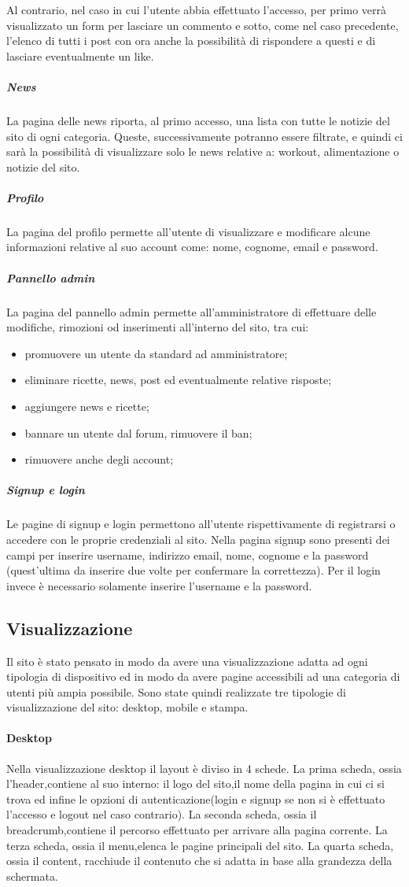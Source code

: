Al contrario, nel caso in cui l'utente abbia effettuato l'accesso, per primo verrà visualizzato un form per lasciare un commento e sotto, come nel caso precedente, l'elenco di tutti i post con ora anche la possibilità di rispondere a questi e di lasciare eventualmente un like.
\subparagraph{News}
La pagina delle news riporta, al primo accesso, una lista con tutte le notizie del sito di ogni categoria. Queste, successivamente potranno essere filtrate, e quindi ci sarà la possibilità di visualizzare solo le news relative a: workout, alimentazione o notizie del sito.
\subparagraph{Profilo}
La pagina del profilo permette all'utente di visualizzare e modificare alcune informazioni relative al suo account come: nome, cognome, email e password.
\subparagraph{Pannello admin}
La pagina del pannello admin permette all'amministratore di effettuare delle modifiche, rimozioni od inserimenti all'interno del sito, tra cui: 
\begin{itemize}
	\item promuovere un utente da standard ad amministratore;
	\item eliminare ricette, news, post ed eventualmente relative risposte;
	\item aggiungere news e ricette;
	\item bannare un utente dal forum, rimuovere il ban;
	\item rimuovere anche degli account;
\end{itemize}     
\subparagraph{Signup e login}
Le pagine di signup e login permettono all'utente rispettivamente di  registrarsi o accedere con le proprie credenziali al sito. Nella pagina signup sono presenti dei campi per inserire username, indirizzo email, nome, cognome e la password (quest’ultima da inserire due volte per confermare la correttezza). Per il login invece è necessario solamente inserire l'username e la password.
\subsection{Visualizzazione}
Il sito è stato pensato in modo da avere una visualizzazione adatta ad ogni tipologia di dispositivo ed in modo da avere pagine accessibili ad una categoria di utenti più ampia possibile.
Sono state quindi realizzate tre tipologie di visualizzazione del sito: desktop, mobile e stampa.
\paragraph{Desktop}
Nella visualizzazione desktop il layout è diviso in 4 schede.
La prima scheda, ossia l'header,contiene al suo interno: il logo del sito,il nome della pagina in cui ci si trova ed infine le opzioni di autenticazione(login e signup se non si è effettuato l'accesso e logout nel caso contrario).
La seconda scheda, ossia il breadcrumb,contiene il percorso effettuato per arrivare alla pagina corrente.
La terza scheda, ossia il menu,elenca le pagine principali del sito.
La quarta scheda, ossia il content, racchiude il contenuto che si adatta in base alla grandezza della schermata.
